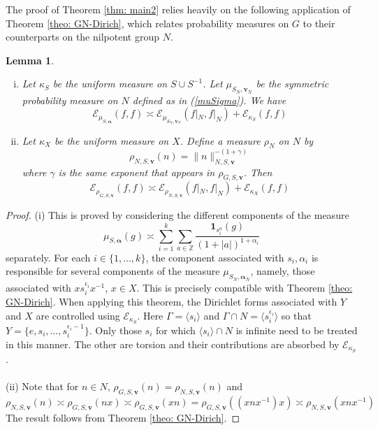 \documentclass[pdflatex,sn-mathphys-num]{sn-jnl}%
\theoremstyle{thmstyleone}%
\theoremstyle{thmstyletwo}%
\theoremstyle{thmstylethree}%
\newtheorem{lem}{Lemma}%
\begin{document}
The proof of Theorem \ref{thm: main2} relies heavily on the following application of Theorem \ref{theo: GN-Dirich}, which relates probability measures on $G$ to their counterparts on the nilpotent group $N$. 
\begin{lem}
\label{lem: GN_comp}
\begin{enumerate}[(i)]
    \item  Let $\kappa_S$  be the uniform measure on $S\cup S^{-1}$. Let $\mu_{S_N,\mathbf{v}_N}$ be the symmetric probability measure on $N$ defined as in (\ref{muSigma}). 
    We have    $$\mathcal{E}_{\mu_{S, \bm{\alpha}}}(f,f) \asymp \mathcal{E}_{\mu_{S_N,\mathbf{v}_N}}(f|_N, f|_N) + \mathcal{E}_{\kappa_S}(f,f)  $$
    \item  Let $\kappa_X$ be the uniform measure on $X$. Define a measure $\rho_N$ on $N$ by
    $$\rho_{N,S,\mathbf{v}} (n) =  \|n\|_{N,S, \mathbf{v}}^{-(1+\gamma)}$$
    where $\gamma$ is the same exponent that appears in $\rho_{G,S,\mathbf{v}}$. 
    Then   $$\mathcal{E}_{\rho_{G,S,\mathbf{v}}}(f,f)\asymp \mathcal{E}_{\rho_{N,S,\mathbf{v}}}(f|_N,f|_N) + \mathcal{E}_{\kappa_X}(f,f)$$ 
\end{enumerate}
\end{lem}

\begin{proof} 
(i) This is proved by considering the different components of the measure     
$$\mu_{S,\bm{\alpha}}(g) \asymp \sum_{i=1}^k \sum_{a\in \mathbb{Z}} \frac{\mathbf{1}_{ s_i^a}(g)}{(1+|a|)^{1+\alpha_i}}$$
separately. For each $i\in\{1,\dots, k\}$, the component associated with $s_i,\alpha_i$ is responsible for several components of the measure $\mu_{S_N,\bm{\alpha}_N}$, namely, those associated with
$xs_i^{\epsilon_i}x^{-1}$, $x\in X$. This is precisely compatible with Theorem \ref{theo: GN-Dirich}. When applying this theorem, the Dirichlet forms associated with $Y$ and $X$ are controlled using $\mathcal E_{\kappa_S}$. Here $\Gamma=\langle s_i\rangle$ and $\Gamma\cap N=\langle s_i^{\epsilon_i}\rangle$ so that $Y=\{e,s_i,\dots,s_i^{\epsilon_i-1}\}$. Only those $s_i$ for which $\langle s_i\rangle\cap N$ is infinite need to be treated in this manner. The other are torsion and their contributions are absorbed by $\mathcal E_{\kappa_S}$.\\\\
(ii)  
Note that for $n \in N$, $\rho_{G,S,\mathbf{v}}(n) = \rho_{N,S,\mathbf{v}}(n)$ and 
    $$\rho_{N,S,\mathbf{v}} (n) \asymp \rho_{G,S,\mathbf{v}}(nx) \asymp \rho_{G,S,\mathbf{v}}(xn) = \rho_{G,S,\mathbf{v}}( (xnx^{-1} )x) \asymp \rho_{N,S,\mathbf{v}}(xnx^{-1}) $$
    The result follows from Theorem \ref{theo: GN-Dirich}. 
\end{proof}
 
\end{document}

